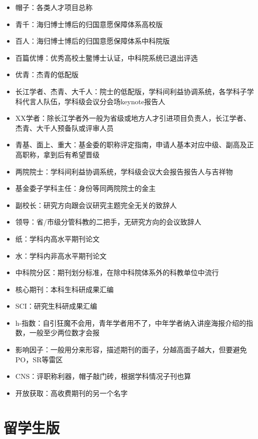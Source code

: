 \documentclass[]{tufte-book}
\begin{document}
\begin{itemize}
\item
  帽子：各类人才项目总称
\item
  青千：海归博士博后的归国意愿保障体系高校版
\item
  百人：海归博士博后的归国意愿保障体系中科院版
\item
  百篇优博：优秀高校土鳖博士认证，中科院系统已退出评选
\item
  优青：杰青的低配版
\item
  长江学者、杰青、大千人：院士的低配版，学科间利益协调系统，各学科子学科代言人队伍，学科级会议分会场keynote报告人
\item
  XX学者：除长江学者外一般为省级或地方人才引进项目负责人，长江学者、杰青、大千人预备队或评审人员
\item
  青基、面上、重大：基金委的职称评定指南，申请人基本对应中级、副高及正高职称，拿到后有希望晋级
\item
  两院院士：学科间利益协调系统，学科级会议大会报告报告人与吉祥物
\item
  基金委子学科主任：身份等同两院院士的金主
\item
  副校长：研究方向跟会议研究主题完全无关的致辞人
\item
  领导：省/市级分管科教的二把手，无研究方向的会议致辞人
\item
  纸：学科内高水平期刊论文
\item
  水：学科内非高水平期刊论文
\item
  中科院分区：期刊划分标准，在除中科院体系外的科教单位中流行
\item
  核心期刊：本科生科研成果汇编
\item
  SCI：研究生科研成果汇编
\item
  h-指数：自引狂魔不会用，青年学者用不了，中年学者纳入讲座海报介绍的指数，一般至少两位数才会报
\item
  影响因子：一般用分来形容，描述期刊的面子，分越高面子越大，但要避免PO，SR等雷区
\item
  CNS：评职称利器，帽子敲门砖，根据学科情况子刊也算
\item
  开放获取：高收费期刊的另一个名字
\end{itemize}

\hypertarget{ux7559ux5b66ux751fux7248}{%
\section*{留学生版}\label{ux7559ux5b66ux751fux7248}}
\end{document}
